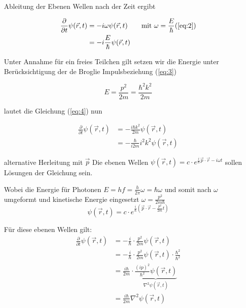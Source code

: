 Ableitung der Ebenen Wellen nach der Zeit ergibt

\begin{align}
  \label{eq:4}
   \frac{\partial}{\partial t}\psi(\vec{r},t) &= -i \omega \psi(\vec{r},t) \qquad \text{mit } \omega=\frac{E}{\hbar} (\ref{eq:2}) \\
&= -i \frac{E}{\hbar} \psi(\vec{r},t) \\
\end{align}

Unter Annahme für ein freies Teilchen gilt setzen wir die Energie unter Berücksichtigung der de Broglie Impulsbeziehung (\ref{eq:3})

\begin{equation}
  \label{eq:6}
  E=\frac{p^2}{2m}=\frac{\hbar^2k^2}{2m}
\end{equation}


lautet die Gleichung (\ref{eq:4}) nun

\begin{align}
  \label{eq:7}
  \frac{\partial}{\partial t}\psi(\vec{r},t) &=-\frac{i\hbar k^2}{2m}  \psi(\vec{r},t) \\
 &=-\frac{\hbar}{i2m} i^2k^2 \psi(\vec{r},t)
\end{align}





alternative Herleitung mit \(\vec p\)
Die ebenen Wellen \(\psi(\vec{r},t)=c\cdot  e^{\frac{i}{\hbar}\vec{p}\cdot\vec{r}-i\omega t}\) sollen  Lösungen der Gleichung sein. 

Wobei die Energie für Photonen \(E=hf=\frac{h}{2\pi}\omega=\hbar\omega\) und somit nach \(\omega\) umgeformt und kinetische Energie eingesetzt \(\omega = \frac{p^2}{2m\hbar}\)  \\

  \begin{equation}
    \label{eq:1}
    \psi(\vec{r},t)=c\cdot  e^{\frac{i}{\hbar}(\vec{p}\cdot\vec{r}-\frac{p^{2}}{2m}t)}
  \end{equation}

  Für diese ebenen Wellen gilt:
  \begin{align*}
    \frac{\partial}{\partial t}\psi(\vec{r},t) &=
      -\frac{i}{\hbar}\cdot\frac{p^{2}}{2m}\psi(\vec{r},t)\\
      &=-\frac{i}{\hbar}\cdot\frac{p^{2}}{2m}\psi(\vec{r},t)
      \cdot \frac{\hbar^2}{\hbar^2}\\
  &= \frac{i\hbar}{2m}\cdot  \underbrace{\frac{(ip)^2}{\hbar^2}\psi(\vec{r},t)}_{\nabla^2\psi(\vec{r},t)}\\
  &= \frac{i\hbar}{2m}\nabla^2\psi(\vec{r},t)
\end{align*}


